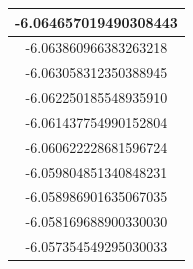 \documentclass[a4paper]{article}
\begin{document}
\begin{table}[H]
\begin{multicols}{3}
\begin{tabular}{|c|}
-6.064657019490308443 \\ \hline
-6.063860966383263218 \\ \hline
-6.063058312350388945 \\ \hline
-6.062250185548935910 \\ \hline
-6.061437754990152804 \\ \hline
-6.060622228681596724 \\ \hline
-6.059804851340848231 \\ \hline
-6.058986901635067035 \\ \hline
-6.058169688900330030 \\ \hline
-6.057354549295030033 \\ \hline
\end{tabular}

\end{multicols}

\end{table}
\end{document}
